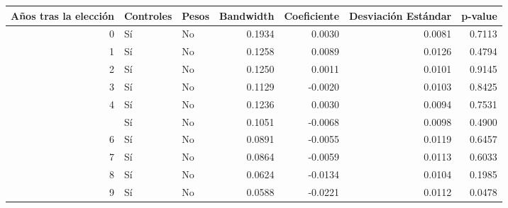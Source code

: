 
\begin{tabular}{rllrrrr}
\toprule
Años tras la elección & Controles & Pesos & Bandwidth & Coeficiente & Desviación Estándar & p-value\\
\midrule
0 & Sí & No & 0.1934 & 0.0030 & 0.0081 & 0.7113\\
1 & Sí & No & 0.1258 & 0.0089 & 0.0126 & 0.4794\\
2 & Sí & No & 0.1250 & 0.0011 & 0.0101 & 0.9145\\
3 & Sí & No & 0.1129 & -0.0020 & 0.0103 & 0.8425\\
4 & Sí & No & 0.1236 & 0.0030 & 0.0094 & 0.7531\\
\addlinespace
5 & Sí & No & 0.1051 & -0.0068 & 0.0098 & 0.4900\\
6 & Sí & No & 0.0891 & -0.0055 & 0.0119 & 0.6457\\
7 & Sí & No & 0.0864 & -0.0059 & 0.0113 & 0.6033\\
8 & Sí & No & 0.0624 & -0.0134 & 0.0104 & 0.1985\\
9 & Sí & No & 0.0588 & -0.0221 & 0.0112 & 0.0478\\
\bottomrule
\end{tabular}